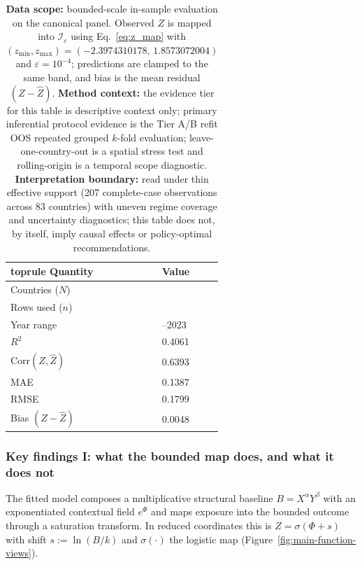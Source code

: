 \documentclass[11pt]{article}
\newcommand{\TableStyle}{%
    \small
    \setlength{\tabcolsep}{2pt}%
    \renewcommand{\arraystretch}{0.9}%
}
\begin{document}
\begin{table}[!htbp]
\centering
\TableStyle
\captionsetup{justification=RaggedRight,singlelinecheck=false}
\caption{\textbf{Data scope:} bounded-scale in-sample evaluation on the canonical panel. Observed $Z$ is mapped into $\mathcal{I}_\varepsilon$ using Eq.~\eqref{eq:z_map} with $(z_{\min},z_{\max})=(\num{-2.3974310178},\,\num{1.8573072004})$ and $\varepsilon=10^{-4}$; predictions are clamped to the same band, and bias is the mean residual $(Z-\widehat{Z})$. \textbf{Method context:} the evidence tier for this table is descriptive context only; primary inferential protocol evidence is the Tier A/B refit OOS repeated grouped $k$-fold evaluation; leave-one-country-out is a spatial stress test and rolling-origin is a temporal scope diagnostic. \textbf{Interpretation boundary:} read under thin effective support (207 complete-case observations across 83 countries) with uneven regime coverage and uncertainty diagnostics; this table does not, by itself, imply causal effects or policy-optimal recommendations.}
\label{tab:panel_fit_headline}
\begin{tabularx}{0.86\linewidth}{@{}l >{\raggedleft\arraybackslash}X@{}}

\csname toprule\endcsname
Quantity & Value \\
\midrule
Countries ($N$) & 83 \\
Rows used ($n$) & 207 \\
Year range & 1990--2023 \\
$R^2$ & \num{0.4061} \\
$\mathrm{Corr}(Z,\widehat{Z})$ & \num{0.6393} \\
MAE & \num{0.1387} \\
RMSE & \num{0.1799} \\
Bias $(Z-\widehat{Z})$ & \num{0.0048} \\
\bottomrule
\end{tabularx}
\end{table}

\subsubsection*{Key findings I: what the bounded map does, and what it does not}

The fitted model composes a multiplicative structural baseline $B=X^{\alpha}Y^{\beta}$ with an exponentiated contextual field $e^{\Phi}$ and maps exposure into the bounded outcome through a saturation transform. In reduced coordinates this is $Z=\sigma(\Phi+s)$ with shift $s:=\ln(B/k)$ and $\sigma(\cdot)$ the logistic map (Figure~\ref{fig:main-function-views}).
\end{document}
